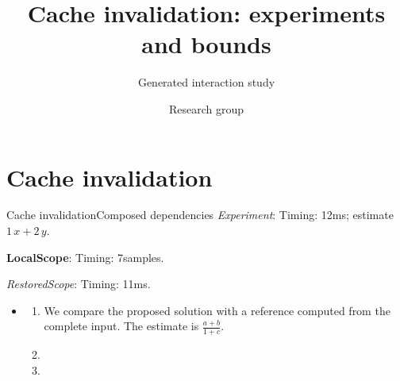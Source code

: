 \documentclass[11pt,aspectratio=43]{beamer}
\title{Cache invalidation: experiments and bounds}
\subtitle{Generated interaction study}
\author{Research group}
\date{}
\newcommand{\fuzzlayerA}[1]{\textit{#1}}
\newcommand{\fuzzlayerB}[1]{\fuzzlayerA{#1}}
\newcommand{\fuzzlayerC}[1]{\fuzzlayerB{#1}}
\newcommand{\fuzzterm}[1]{\fuzzlayerC{#1}}
\newcommand{\fuzzpair}[2]{\fuzzterm{#1}: #2}
\newcommand{\fuzzunit}{ms}
\newcommand{\fuzzcoefficient}{1}
\newcommand{\fuzzscale}[2][\fuzzcoefficient]{#1\,#2}
\begin{document}
\section{Cache invalidation}
\begin{frame}[t,shrink=5]{Cache invalidation}{Composed dependencies}
\fuzzpair{Experiment}{Timing: 12\fuzzunit; estimate $\fuzzscale{x}+\fuzzscale[2]{y}$.}\par
{\renewcommand{\fuzzunit}{samples}\let\fuzzterm\textbf\fuzzpair{LocalScope}{Timing: 7\fuzzunit.}\par}
\fuzzpair{RestoredScope}{Timing: 11\fuzzunit.}\par
{\small\color{black}\raggedright
\begin{itemize}
\item<1-> \begin{enumerate}
\item<1-> \textrm{We compare the} proposed solution with a reference computed from the complete input.  The estimate is $\frac{a+b}{1+c}$.
\item<2-> 
\item<2-> 
\end{enumerate}
\end{itemize}}
\end{frame}
\end{document}
